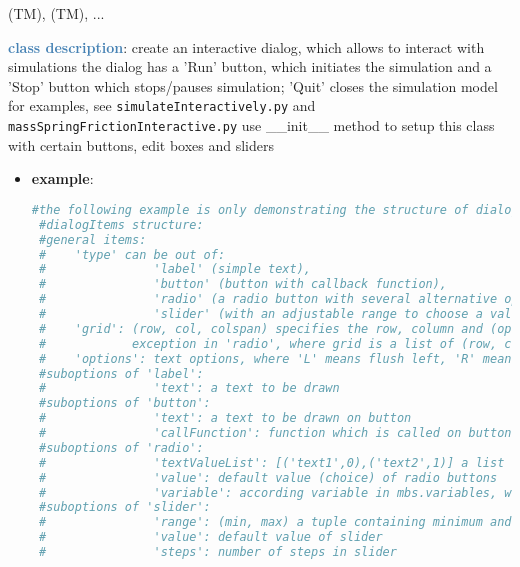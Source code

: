 \begin{itemize}[leftmargin=1.4cm]
\begin{itemize}[leftmargin=0.5cm]
\begin{itemize}[leftmargin=1.4cm]
\begin{itemize}[leftmargin=1.4cm]
\begin{itemize}[leftmargin=0.5cm]
\begin{itemize}[leftmargin=1.4cm]
\begin{itemize}[leftmargin=0.5cm]
\begin{itemize}[leftmargin=1.4cm]
\begin{itemize}[leftmargin=1.4cm]
 (TM), 
 (TM), 
 ...
\ei

%
\noindent\textcolor{steelblue}{{\bf class description}}:  create an interactive dialog, which allows to interact with simulations
the dialog has a 'Run' button, which initiates the simulation and a 'Stop' button which stops/pauses simulation; 'Quit' closes the simulation model
for examples, see \texttt{simulateInteractively.py} and \texttt{massSpringFrictionInteractive.py}
use \_\_init\_\_ method to setup this class with certain buttons, edit boxes and sliders
\setlength{\itemindent}{0.7cm}
\begin{itemize}[leftmargin=0.7cm]
  \item[--]  {\bf example}: \vspace{-12pt}\ei\begin{lstlisting}[language=Python, xleftmargin=36pt]
#the following example is only demonstrating the structure of dialogItems and plots
 #dialogItems structure:
 #general items:
 #    'type' can be out of:
 #               'label' (simple text),
 #               'button' (button with callback function),
 #               'radio' (a radio button with several alternative options),
 #               'slider' (with an adjustable range to choose a value)
 #    'grid': (row, col, colspan) specifies the row, column and (optionally) the span of columns the item is placed at;
 #            exception in 'radio', where grid is a list of (row, col) for every choice
 #    'options': text options, where 'L' means flush left, 'R' means flush right
 #suboptions of 'label':
 #               'text': a text to be drawn
 #suboptions of 'button':
 #               'text': a text to be drawn on button
 #               'callFunction': function which is called on button-press
 #suboptions of 'radio':
 #               'textValueList': [('text1',0),('text2',1)] a list of texts with according values
 #               'value': default value (choice) of radio buttons
 #               'variable': according variable in mbs.variables, which is set to current radio button value
 #suboptions of 'slider':
 #               'range': (min, max) a tuple containing minimum and maximum value of slider
 #               'value': default value of slider
 #               'steps': number of steps in slider

\end{lstlisting}
\end{itemize}
\end{itemize}
\end{itemize}
\end{itemize}
\end{itemize}
\end{itemize}
\end{itemize}
\end{itemize}
\end{itemize}
\end{itemize}
